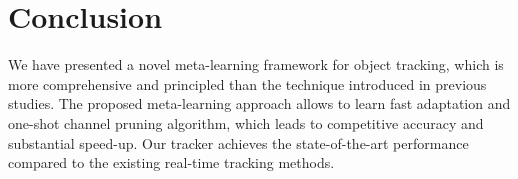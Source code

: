 \documentclass[letterpaper]{article} %
\begin{document}
\begin{table}[t!]
\begin{center}
\caption{Internal variations with learning rate pretrained on ImageNet-Vid dataset.}
\label{tab:loss}
\end{center}
\end{table}
\fi


\section{Conclusion}
\label{sec:conclusion}
We have presented a novel meta-learning framework for object tracking, which is more comprehensive and principled than the technique introduced in previous studies.
The proposed meta-learning approach allows to learn fast adaptation and one-shot channel pruning algorithm, which leads to competitive accuracy and substantial speed-up.
Our tracker achieves the state-of-the-art performance compared to the existing real-time tracking methods.

\end{document}
